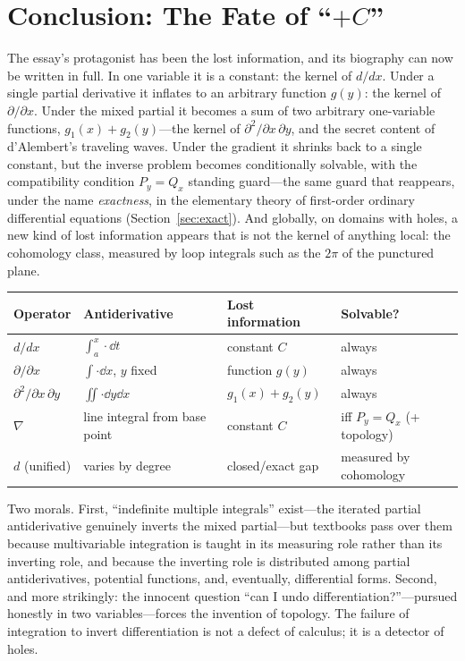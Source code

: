 \documentclass{essay}
\begin{document}
\section{Conclusion: The Fate of ``\(+C\)''}

The essay's protagonist has been the lost information, and its biography can now be written in full. In one variable it is a constant: the kernel of \(d/dx\). Under a single partial derivative it inflates to an arbitrary function \(g(y)\): the kernel of \(\partial/\partial x\). Under the mixed partial it becomes a sum of two arbitrary one-variable functions, \(g_{1}(x) + g_{2}(y)\)---the kernel of \(\partial^{2}/\partial x\,\partial y\), and the secret content of d'Alembert's traveling waves. Under the gradient it shrinks back to a single constant, but the inverse problem becomes conditionally solvable, with the compatibility condition \(P_{y} = Q_{x}\) standing guard---the same guard that reappears, under the name \emph{exactness}, in the elementary theory of first-order ordinary differential equations (Section~\ref{sec:exact}). And globally, on domains with holes, a new kind of lost information appears that is not the kernel of anything local: the cohomology class, measured by loop integrals such as the \(2\pi\) of the punctured plane.

\begin{center}
  \begin{tabular}{@{}llll@{}}
    \toprule
    Operator & Antiderivative & Lost information & Solvable? \\
    \midrule
    \(d/dx\) & \(\int_{a}^{x} \cdot \dd t\) & constant \(C\) & always \\
    \(\partial/\partial x\) & \(\int \cdot \dd x\), \(y\) fixed & function \(g(y)\) & always \\
    \(\partial^{2}/\partial x\,\partial y\) & \(\iint \cdot \dd y\dd x\) & \(g_{1}(x) + g_{2}(y)\) & always \\
    \(\nabla\) & line integral from base point & constant \(C\) & iff \(P_{y} = Q_{x}\) (+ topology) \\
    \(d\) (unified) & varies by degree & closed/exact gap & measured by cohomology \\
    \bottomrule
  \end{tabular}
\end{center}

Two morals. First, ``indefinite multiple integrals'' exist---the iterated partial antiderivative genuinely inverts the mixed partial---but textbooks pass over them because multivariable integration is taught in its measuring role rather than its inverting role, and because the inverting role is distributed among partial antiderivatives, potential functions, and, eventually, differential forms. Second, and more strikingly: the innocent question ``can I undo differentiation?''---pursued honestly in two variables---forces the invention of topology. The failure of integration to invert differentiation is not a defect of calculus; it is a detector of holes.
\end{document}
